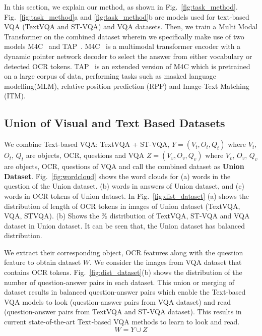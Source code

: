 \documentclass[10pt,twocolumn,letterpaper]{article}
\begin{document}
In this section, we explain our method, as shown in Fig.~\ref{fig:task_method}. Fig.~\ref{fig:task_method}a and \ref{fig:task_method}b are models used for text-based VQA (TextVQA and ST-VQA) and VQA datasets. Then, we train a Multi Modal Transformer on the combined dataset wherein we specifically make use of two models M4C~\cite{M4C:2020} and TAP~\cite{TAP}. M4C~\cite{M4C:2020} is a multimodal transformer encoder with a dynamic pointer network decoder to select the answer from either vocabulary or detected OCR tokens. TAP~\cite{TAP} is an extended version of M4C which is pretrained on a large corpus of data, performing tasks such as masked language modelling(MLM), relative position prediction (RPP) and Image-Text Matching (ITM).


\subsection{Union of Visual and Text Based Datasets}
\label{subsec:union_dataset}


We combine Text-based VQA: TextVQA + ST-VQA, $Y = (V_t,O_t,Q_t)$ where $V_t$, $O_t$, $Q_t$ are objects, OCR, questions and VQA $Z = (V_v,O_v,Q_v)$ where $V_v$, $O_v$, $Q_v$ are objects, OCR, questions of VQA and call the combined dataset as \textbf{Union Dataset}. Fig.~\ref{fig:wordcloud} shows the word clouds for (a) words in the question of the Union dataset. (b) words in answers of Union dataset, and (c) words in OCR tokens of Union dataset. In Fig.~\ref{fig:dist_dataset} (a) shows the distribution of length of OCR tokens in images of Union dataset (TextVQA, VQA, STVQA). (b) Shows the \% distribution of TextVQA, ST-VQA and VQA dataset in Union dataset. It can be seen that, the Union dataset has balanced distribution.

We extract their corresponding object, OCR features along with the question feature to obtain dataset $W$. We consider the images from VQA \cite{first-vqa:2017} dataset that contains OCR tokens. Fig.~\ref{fig:dist_dataset}(b) shows the distribution of the number of question-answer pairs in each dataset. This union or merging of dataset results in balanced question-answer pairs which enable the Text-based VQA models to look (question-answer pairs from VQA dataset) and read (question-answer pairs from TextVQA and ST-VQA dataset). This results in current state-of-the-art Text-based VQA methods to learn to look and read.
\begin{equation}
    W = Y \cup Z
\end{equation}
\end{document}
